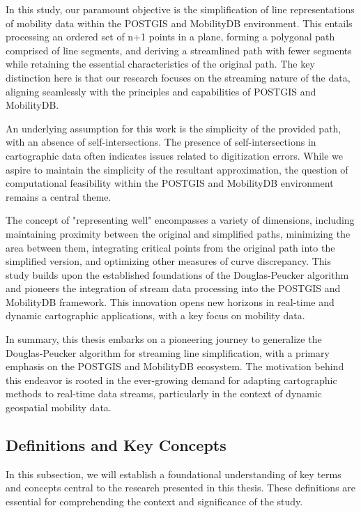 \documentclass[twoside,12pt, a4paper]{report}
\begin{document}
In this study, our paramount objective is the simplification of line representations of mobility data within the POSTGIS and MobilityDB environment. This entails processing an ordered set of n+1 points in a plane, forming a polygonal path comprised of line segments, and deriving a streamlined path with fewer segments while retaining the essential characteristics of the original path. The key distinction here is that our research focuses on the streaming nature of the data, aligning seamlessly with the principles and capabilities of POSTGIS and MobilityDB.

An underlying assumption for this work is the simplicity of the provided path, with an absence of self-intersections. The presence of self-intersections in cartographic data often indicates issues related to digitization errors. While we aspire to maintain the simplicity of the resultant approximation, the question of computational feasibility within the POSTGIS and MobilityDB environment remains a central theme.

The concept of "representing well" encompasses a variety of dimensions, including maintaining proximity between the original and simplified paths, minimizing the area between them, integrating critical points from the original path into the simplified version, and optimizing other measures of curve discrepancy. This study builds upon the established foundations of the Douglas-Peucker algorithm and pioneers the integration of stream data processing into the POSTGIS and MobilityDB framework. This innovation opens new horizons in real-time and dynamic cartographic applications, with a key focus on mobility data.

In summary, this thesis embarks on a pioneering journey to generalize the Douglas-Peucker algorithm for streaming line simplification, with a primary emphasis on the POSTGIS and MobilityDB ecosystem. The motivation behind this endeavor is rooted in the ever-growing demand for adapting cartographic methods to real-time data streams, particularly in the context of dynamic geospatial mobility data.

\iffalse
\subsection{Definitions and Key Concepts}
In this subsection, we will establish a foundational understanding of key terms and concepts central to the research presented in this thesis. These definitions are essential for comprehending the context and significance of the study.
\end{document}
